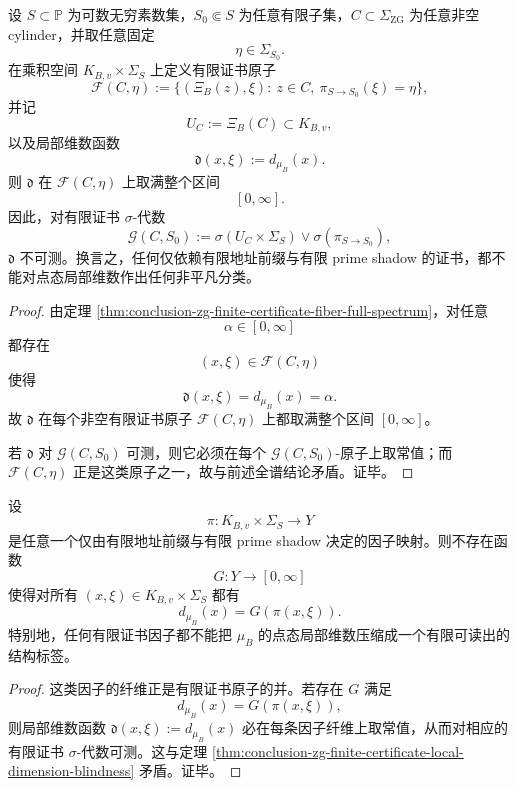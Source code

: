 \begin{theorem}[有限证书对点态局部维数的绝对盲性]\label{thm:conclusion-zg-finite-certificate-local-dimension-blindness}
设 \(S\subset \mathbb P\) 为可数无穷素数集，\(S_0\Subset S\) 为任意有限子集，\(C\subset\Sigma_{\mathrm{ZG}}\) 为任意非空 cylinder，并取任意固定
\[
\eta\in\Sigma_{S_0}.
\]
在乘积空间 \(K_{B,v}\times \Sigma_S\) 上定义有限证书原子
\[
\mathcal F(C,\eta)
:=
\{(\Xi_B(z),\xi):\ z\in C,\ \pi_{S\to S_0}(\xi)=\eta\},
\]
并记
\[
U_C:=\Xi_B(C)\subset K_{B,v},
\]
以及局部维数函数
\[
\mathfrak d(x,\xi):=d_{\mu_B}(x).
\]
则 \(\mathfrak d\) 在 \(\mathcal F(C,\eta)\) 上取满整个区间
\[
[0,\infty].
\]
因此，对有限证书 \(\sigma\)-代数
\[
\mathcal G(C,S_0)
:=
\sigma(U_C\times \Sigma_S)\vee \sigma(\pi_{S\to S_0}),
\]
\(\mathfrak d\) 不可测。换言之，任何仅依赖有限地址前缀与有限 prime shadow 的证书，都不能对点态局部维数作出任何非平凡分类。
\end{theorem}
\begin{proof}
由定理 \ref{thm:conclusion-zg-finite-certificate-fiber-full-spectrum}，对任意
\[
\alpha\in[0,\infty]
\]
都存在
\[
(x,\xi)\in \mathcal F(C,\eta)
\]
使得
\[
\mathfrak d(x,\xi)=d_{\mu_B}(x)=\alpha.
\]
故 \(\mathfrak d\) 在每个非空有限证书原子 \(\mathcal F(C,\eta)\) 上都取满整个区间 \([0,\infty]\)。

若 \(\mathfrak d\) 对 \(\mathcal G(C,S_0)\) 可测，则它必须在每个 \(\mathcal G(C,S_0)\)-原子上取常值；而 \(\mathcal F(C,\eta)\) 正是这类原子之一，故与前述全谱结论矛盾。证毕。
\end{proof}

\begin{corollary}[有限证书因子不存在局部维数读出器]\label{cor:conclusion-zg-finite-factor-no-local-dimension-reader}
设
\[
\pi:K_{B,v}\times \Sigma_S\to Y
\]
是任意一个仅由有限地址前缀与有限 prime shadow 决定的因子映射。则不存在函数
\[
G:Y\to [0,\infty]
\]
使得对所有 \((x,\xi)\in K_{B,v}\times \Sigma_S\) 都有
\[
d_{\mu_B}(x)=G(\pi(x,\xi)).
\]
特别地，任何有限证书因子都不能把 \(\mu_B\) 的点态局部维数压缩成一个有限可读出的结构标签。
\end{corollary}
\begin{proof}
这类因子的纤维正是有限证书原子的并。若存在 \(G\) 满足
\[
d_{\mu_B}(x)=G(\pi(x,\xi)),
\]
则局部维数函数 \(\mathfrak d(x,\xi):=d_{\mu_B}(x)\) 必在每条因子纤维上取常值，从而对相应的有限证书 \(\sigma\)-代数可测。这与定理 \ref{thm:conclusion-zg-finite-certificate-local-dimension-blindness} 矛盾。证毕。
\end{proof}

